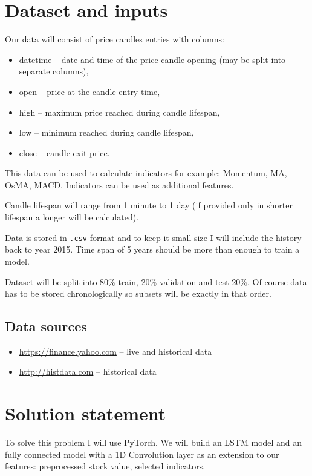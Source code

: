 \documentclass[a4paper,12pt]{article}
\begin{document}
\section{Dataset and inputs}
Our data will consist of price candles entries with columns:
\begin{itemize}
\item datetime -- date and time of the price candle opening (may be split into separate columns),
\item open -- price at the candle entry time,
\item high -- maximum price reached during candle lifespan,
\item low -- minimum reached during candle lifespan,
\item close -- candle exit price.
\end{itemize}

This data can be used to calculate indicators for example: Momentum, MA, OsMA, MACD. Indicators can be used as additional features.

Candle lifespan will range from 1 minute to 1 day (if provided only in shorter lifespan a longer will be calculated).

Data is stored in \texttt{.csv} format and to keep it small size I will include the history back to year 2015. Time span of 5 years should be more than enough to train a model.

Dataset will be split into 80\% train, 20\% validation and test 20\%.
Of course data has to be stored chronologically so subsets will be exactly in that order.

\subsection*{Data sources}
\begin{itemize}
	\item \url{https://finance.yahoo.com} -- live and historical data
	\item \url{http://histdata.com} -- historical data
\end{itemize}

\section{Solution statement}
To solve this problem I will use PyTorch.
We will build an LSTM model and an fully connected model with a 1D Convolution layer as an extension to our features: preprocessed stock value, selected indicators.
\end{document}
